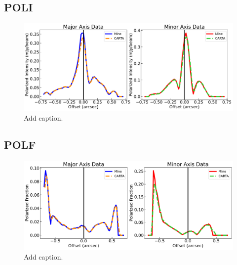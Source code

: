 \subsection{POLI}
\begin{figure}[h]
  \centering
  \includegraphics[width=1.1\textwidth]{WRITEUP_AND_IMAGES/IMAGES/IRS63_POLI_slice_BAND4.pdf}
  \caption{Add caption.}
  \label{fig: }
\end{figure}


\subsection{POLF}
\begin{figure}[h]
  \centering
  \includegraphics[width=1.1\textwidth]{WRITEUP_AND_IMAGES/IMAGES/IRS63_POLF_slice_BAND4.pdf}
  \caption{Add caption.}
  \label{fig: }
\end{figure}






